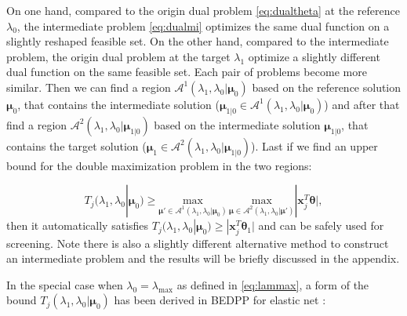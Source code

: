 On one hand, compared to the origin dual problem \eqref{eq:dualtheta} at the reference $\lambda_0$, the intermediate problem \eqref{eq:dualmi} optimizes the same dual function on a slightly reshaped feasible set. On the other hand, compared to the intermediate problem, the origin dual problem at the target $\lambda_1$ optimize a slightly different dual function on the same feasible set. Each pair of problems become more similar. Then we can find a region $\mathcal{A}^1(\lambda_1,\lambda_0|\boldsymbol\mu_0)$ based on the reference solution $\boldsymbol\mu_0$, that contains the intermediate solution ($\boldsymbol\mu_{1|0}\in \mathcal{A}^1(\lambda_1,\lambda_0|\boldsymbol\mu_0)$) and after that find a region $\mathcal{A}^2(\lambda_1,\lambda_0|\boldsymbol\mu_{1|0})$ based on the intermediate solution $\boldsymbol\mu_{1|0}$, that contains the target solution  ($\boldsymbol\mu_1\in \mathcal{A}^2(\lambda_1,\lambda_0|\boldsymbol\mu_{1|0})$). Last if we find an upper bound for the double maximization problem in the two regions:

\begin{equation}
    \label{eq:boundbound}
    T_j(\lambda_{1},\lambda_{0}|\boldsymbol\mu_0)\geq \underset{\boldsymbol\mu'\in\mathcal{A}^1(\lambda_1,\lambda_0|\boldsymbol\mu_0)}{\mathrm{max}}\,\underset{\boldsymbol\mu\in\mathcal{A}^2(\lambda_1,\lambda_0|\boldsymbol\mu')}{\mathrm{max}}|\boldsymbol x_j^T\boldsymbol\theta|,
\end{equation}
then it automatically satisfies $T_j(\lambda_{1},\lambda_{0}|\boldsymbol\mu_0)\geq |\boldsymbol x_j^T\boldsymbol\theta_1|$ and can be safely used for screening. Note there is also a slightly different alternative method to construct an intermediate problem and the results will be briefly discussed in the appendix.

In the special case when $\lambda_0=\lambda_{\max}$ as defined in \eqref{eq:lammax}, a form of the bound $T_j(\lambda_{1},\lambda_{0}|\boldsymbol\mu_0)$ has been derived in BEDPP for elastic net \citep{Zeng2021}:

